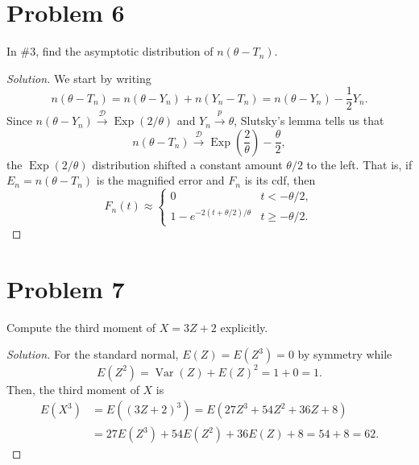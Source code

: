 \documentclass{article}
\begin{document}
\newpage
\section*{Problem 6}
In \#3, find the asymptotic distribution of $n(\theta - T_n)$.

\begin{proof}[Solution]
We start by writing
\begin{equation*}
n(\theta - T_n) = n(\theta - Y_n) + n(Y_n - T_n) = n(\theta - Y_n) - \frac{1}{2}Y_n.
\end{equation*}
Since $n(\theta - Y_n)\stackrel{\mathcal{D}}{\to}\operatorname{Exp}(2/\theta)$ and $Y_n\stackrel{p}{\to}\theta$, Slutsky's lemma tells us that
\begin{equation*}
n(\theta - T_n)\stackrel{\mathcal{D}}{\longrightarrow}\boxed{\operatorname{Exp}\left(\frac{2}{\theta}\right) - \frac{\theta}{2}},
\end{equation*}
the $\operatorname{Exp}(2/\theta)$ distribution shifted a constant amount $\theta/2$ to the left. That is, if $E_n = n(\theta - T_n)$ is the magnified error and $F_n$ is its cdf, then
\begin{equation*}
F_n(t)\approx\begin{cases} 0 & t < -\theta/2, \\ 1 - e^{-2(t + \theta/2)/\theta} & t\geq -\theta/2. \end{cases}
\end{equation*}
\end{proof}


\section*{Problem 7}
Compute the third moment of $X = 3Z + 2$ explicitly.

\begin{proof}[Solution]
For the standard normal, $E(Z) = E(Z^3) = 0$ by symmetry while
\begin{equation*}
E(Z^2) = \operatorname{Var}(Z) + E(Z)^2 = 1 + 0 = 1.
\end{equation*}
Then, the third moment of $X$ is
\begin{align*}
E(X^3) &= E((3Z + 2)^3) = E(27Z^3 + 54Z^2 + 36Z + 8) \\
&= 27E(Z^3) + 54E(Z^2) + 36E(Z) + 8 = 54 + 8 = \boxed{62}.
\end{align*}
\end{proof}
\end{document}
